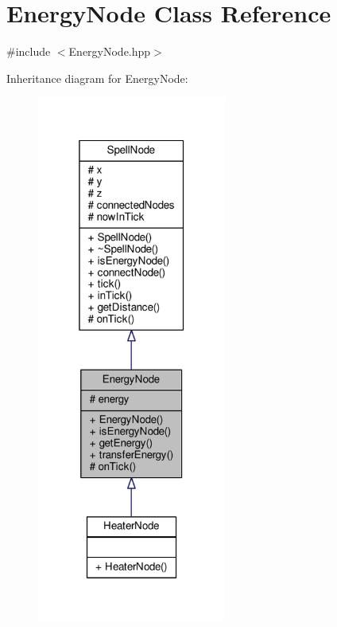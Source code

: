 \hypertarget{class_energy_node}{\section{Energy\-Node Class Reference}
\label{class_energy_node}
}


{\ttfamily \#include $<$Energy\-Node.\-hpp$>$}



Inheritance diagram for Energy\-Node\-:
\nopagebreak
\begin{figure}[H]
\begin{center}
\leavevmode
\includegraphics[width=176pt]{class_energy_node__inherit__graph}
\end{center}
\end{figure}


